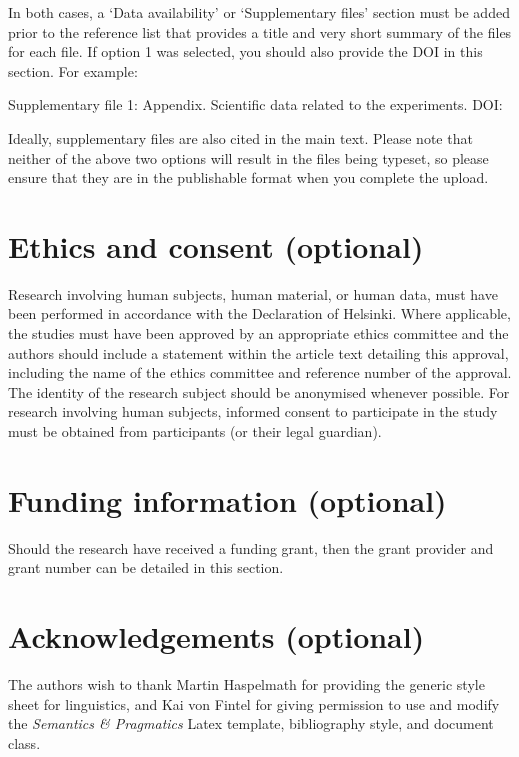 \documentclass[charis,linguex]{glossa}
\begin{document}
\noindent In both cases, a `Data availability' or `Supplementary files' section must be added prior to the reference list that provides a title and very short summary of the files for each file. If option 1 was selected, you should also provide the DOI in this section. For example:

\noindent Supplementary file 1: Appendix. Scientific data related to the experiments. DOI: 

Ideally, supplementary files are also cited in the main text. Please note that neither of the above two options will result in the files being typeset, so please ensure that they are in the publishable format when you complete the upload.


\section*{Ethics and consent (optional)}

Research involving human subjects, human material, or human data, must have been performed in accordance with the Declaration of Helsinki. Where applicable, the studies must have been approved by an appropriate ethics committee and the authors should include a statement within the article text detailing this approval, including the name of the ethics committee and reference number of the approval. The identity of the research subject should be anonymised whenever possible. For research involving human subjects, informed consent to participate in the study must be obtained from participants (or their legal guardian).


\section*{Funding information (optional)}

Should the research have received a funding grant, then the grant provider and grant number can be detailed in this section. 

\section*{Acknowledgements (optional)}

The authors wish to thank Martin Haspelmath for providing the generic style sheet for linguistics, and Kai von Fintel for giving permission to use and modify the \textit{Semantics \& Pragmatics} Latex template, bibliography style, and document class.
\end{document}
